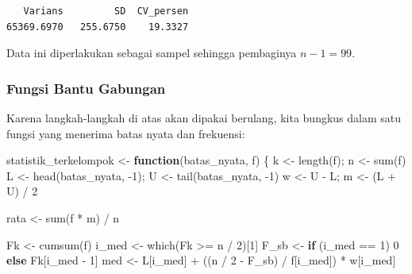 \documentclass[
  indonesian,
  letterpaper,
]{book}
\newenvironment{Shaded}{\begin{snugshade}}{\end{snugshade}}
\newcommand{\ControlFlowTok}[1]{\textcolor[rgb]{0.00,0.23,0.31}{\textbf{#1}}}
\newcommand{\DecValTok}[1]{\textcolor[rgb]{0.68,0.00,0.00}{#1}}
\newcommand{\FunctionTok}[1]{\textcolor[rgb]{0.28,0.35,0.67}{#1}}
\newcommand{\NormalTok}[1]{\textcolor[rgb]{0.00,0.23,0.31}{#1}}
\newcommand{\OtherTok}[1]{\textcolor[rgb]{0.00,0.23,0.31}{#1}}
\newcommand{\SpecialCharTok}[1]{\textcolor[rgb]{0.37,0.37,0.37}{#1}}
\begin{document}
\begin{verbatim}
   Varians         SD  CV_persen 
65369.6970   255.6750    19.3327 
\end{verbatim}

Data ini diperlakukan sebagai sampel sehingga pembaginya \(n - 1 = 99\).

\subsubsection{Fungsi Bantu Gabungan}\label{fungsi-bantu-gabungan}

Karena langkah-langkah di atas akan dipakai berulang, kita bungkus dalam
satu fungsi yang menerima batas nyata dan frekuensi:

\begin{Shaded}
\begin{Highlighting}[]
\NormalTok{statistik\_terkelompok }\OtherTok{\textless{}{-}} \ControlFlowTok{function}\NormalTok{(batas\_nyata, f) \{}
\NormalTok{k }\OtherTok{\textless{}{-}} \FunctionTok{length}\NormalTok{(f); n }\OtherTok{\textless{}{-}} \FunctionTok{sum}\NormalTok{(f)}
\NormalTok{L }\OtherTok{\textless{}{-}} \FunctionTok{head}\NormalTok{(batas\_nyata, }\SpecialCharTok{{-}}\DecValTok{1}\NormalTok{); U }\OtherTok{\textless{}{-}} \FunctionTok{tail}\NormalTok{(batas\_nyata, }\SpecialCharTok{{-}}\DecValTok{1}\NormalTok{)}
\NormalTok{w }\OtherTok{\textless{}{-}}\NormalTok{ U }\SpecialCharTok{{-}}\NormalTok{ L; m }\OtherTok{\textless{}{-}}\NormalTok{ (L }\SpecialCharTok{+}\NormalTok{ U) }\SpecialCharTok{/} \DecValTok{2}

\NormalTok{rata }\OtherTok{\textless{}{-}} \FunctionTok{sum}\NormalTok{(f }\SpecialCharTok{*}\NormalTok{ m) }\SpecialCharTok{/}\NormalTok{ n}

\NormalTok{Fk }\OtherTok{\textless{}{-}} \FunctionTok{cumsum}\NormalTok{(f)}
\NormalTok{i\_med }\OtherTok{\textless{}{-}} \FunctionTok{which}\NormalTok{(Fk }\SpecialCharTok{\textgreater{}=}\NormalTok{ n }\SpecialCharTok{/} \DecValTok{2}\NormalTok{)[}\DecValTok{1}\NormalTok{]}
\NormalTok{F\_sb  }\OtherTok{\textless{}{-}} \ControlFlowTok{if}\NormalTok{ (i\_med }\SpecialCharTok{==} \DecValTok{1}\NormalTok{) }\DecValTok{0} \ControlFlowTok{else}\NormalTok{ Fk[i\_med }\SpecialCharTok{{-}} \DecValTok{1}\NormalTok{]}
\NormalTok{med   }\OtherTok{\textless{}{-}}\NormalTok{ L[i\_med] }\SpecialCharTok{+}\NormalTok{ ((n }\SpecialCharTok{/} \DecValTok{2} \SpecialCharTok{{-}}\NormalTok{ F\_sb) }\SpecialCharTok{/}\NormalTok{ f[i\_med]) }\SpecialCharTok{*}\NormalTok{ w[i\_med]}


\end{Highlighting}
\end{Shaded}
\end{document}
